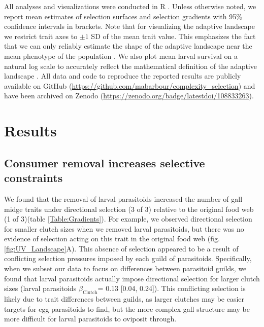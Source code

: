 \documentclass[11pt,]{article}
\begin{document}
All analyses and visualizations were conducted in R \citep{R2018}.
Unless otherwise noted, we report mean estimates of selection surfaces
and selection gradients with 95\% confidence intervals in brackets. Note
that for visualizing the adaptive landscape we restrict trait axes to
\(\pm 1\) SD of the mean trait value. This emphasizes the fact that we
can only reliably estimate the shape of the adaptive landscape near the
mean phenotype of the population \citep{Arnold2001}. We also plot mean
larval survival on a natural log scale to accurately reflect the
mathematical definition of the adaptive landscape \citep{Arnold2003}.
All data and code to reproduce the reported results are publicly
available on GitHub
(\url{https://github.com/mabarbour/complexity_selection}) and have been
archived on Zenodo (\url{https://zenodo.org/badge/latestdoi/108833263}).

\section{Results}\label{results}

\subsection{Consumer removal increases selective
constraints}\label{consumer-removal-increases-selective-constraints}

\indent We found that the removal of larval parasitoids increased the
number of gall midge traits under directional selection (3 of 3)
relative to the original food web (1 of 3)(table \ref{Table:Gradients}).
For example, we observed directional selection for smaller clutch sizes
when we removed larval parasitoids, but there was no evidence of
selection acting on this trait in the original food web (fig.
\ref{fig:UV_Landscape}A). This absence of selection appeared to be a
result of conflicting selection pressures imposed by each guild of
parasitoids. Specifically, when we subset our data to focus on
differences between parasitoid guilds, we found that larval parasitoids
actually impose directional selection for larger clutch sizes (larval
parasitoids \(\beta_{\text{Clutch}}\)= 0.13 {[}0.04, 0.24{]}). This
conflicting selection is likely due to trait differences between guilds,
as larger clutches may be easier targets for egg parasitoids to find,
but the more complex gall structure may be more difficult for larval
parasitoids to oviposit through.

\bigskip
\end{document}
